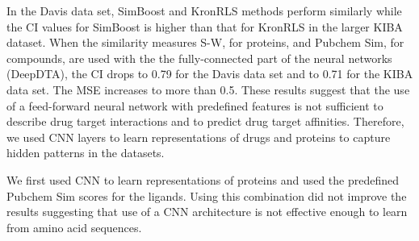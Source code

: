\documentclass[11pt,letterpaper]{article}
\begin{document}
\begin{table}[H]
\caption{The average CI and MSE scores of the test set trained on five different training sets for the KIBA data set. The standard deviations are given in parenthesis.  }  \label{tab:03}  
\end{table}

In the Davis data set,  SimBoost and KronRLS methods perform similarly while the CI values for SimBoost is higher than that for KronRLS in the larger KIBA dataset. When the similarity measures S-W, for proteins, and Pubchem Sim, for compounds, are used with the the fully-connected part of the neural networks (DeepDTA), the CI drops to 0.79 for the Davis data set and to 0.71 for the KIBA data set. The MSE increases to more than 0.5. These results suggest that  the use of a feed-forward neural network with predefined features is not sufficient  to describe drug target interactions and to predict drug target affinities. Therefore, we used CNN layers to learn representations of drugs and proteins to capture hidden patterns in the datasets.

We first used CNN to learn representations of proteins and used the predefined Pubchem Sim scores for the ligands. Using this combination did not improve the results suggesting that use of a CNN architecture is not effective enough to learn from amino acid sequences. 
\end{document}
